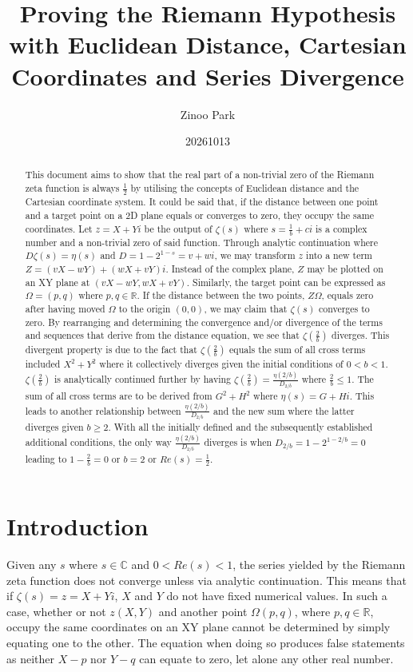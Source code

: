 \documentclass{amsart}
\title[RH Euclidean Cartesian]{Proving the Riemann Hypothesis \\
	with Euclidean Distance, Cartesian Coordinates and Series Divergence}
\author{Zinoo Park}
\date{20261013}
\begin{document}
	\maketitle
	
	\begin{abstract}
		This document aims to show that the real part of a non-trivial zero of the Riemann zeta function is always $\frac12$ by utilising the concepts of Euclidean distance and the Cartesian coordinate system. It could be said that, if the distance between one point and a target point on a 2D plane equals or converges to zero, they occupy the same coordinates. Let $z=X+Yi$ be the output of $\zeta(s)$ where $s=\frac{1}{b} + ci$ is a complex number and a non-trivial zero of said function. Through analytic continuation where $D\zeta(s) = \eta(s)$ and $D=1-2^{1-s}=v+wi$, we may transform $z$ into a new term $Z = (vX-wY) + (wX+vY)i$. Instead of the complex plane, $Z$ may be plotted on an XY plane at $(vX-wY, wX+vY)$. Similarly, the target point can be expressed as $\Omega=(p, q)$ where $p, q \in \mathbb{R}$. If the distance between the two points, $Z\Omega$, equals zero after having moved $\Omega$ to the origin $(0,0)$, we may claim that $\zeta(s)$ converges to zero. By rearranging and determining the convergence and/or divergence of the terms and sequences that derive from the distance equation, we see that $\zeta(\frac{2}{b})$ diverges. This divergent property is due to the fact that $\zeta(\frac{2}{b})$ equals the sum of all cross terms included $X^2 + Y^2$ where it collectively diverges given the initial conditions of $0<b<1$. $\zeta(\frac{2}{b})$ is analytically continued further by having $\zeta(\frac{2}{b}) = \frac{\eta(2/b)}{D_{2/b}}$ where $\frac{2}{b} \leq 1$. The sum of all cross terms are to be derived from $G^2 + H^2$ where $\eta(s)= G + Hi$. This leads to another relationship between $\frac{\eta(2/b)}{D_{2/b}}$ and the new sum where the latter diverges given $b \geq 2$. With all the initially defined and the subsequently established additional conditions, the only way $\frac{\eta(2/b)}{D_{2/b}}$ diverges is when $D_{2/b} = 1-2^{1-2/b} = 0$ leading to $1-\frac{2}{b}=0$ or $b=2$ or $Re(s) = \frac{1}{2}$.
	\end{abstract}
	
	\section{Introduction}
	Given any $s$ where $s \in \mathbb{C}$ and $0<Re(s)<1$, the series yielded by the Riemann zeta function does not converge unless via analytic continuation. This means that if $\zeta(s) = z = X+Yi$, $X$ and $Y$ do not have fixed numerical values. In such a case, whether or not $z(X,Y)$ and another point $\Omega(p,q)$, where $p,q \in \mathbb{R}$, occupy the same coordinates on an XY plane cannot be determined by simply equating one to the other. The equation when doing so produces false statements as neither $X-p$ nor $Y-q$ can equate to zero, let alone any other real number.
	
\end{document}
